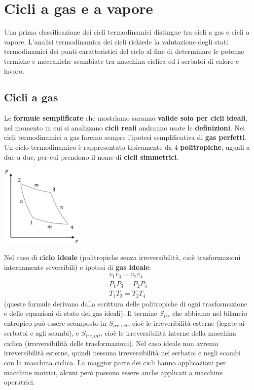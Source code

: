 \section{Cicli a gas e a vapore}
Una prima classificazione dei cicli termodinamici distingue tra cicli a gas e cicli a vapore.
L’analisi termodinamica dei cicli richiede la valutazione degli stati termodinamici dei punti
caratteristici del ciclo al fine di determinare le potenze termiche e meccaniche scambiate tra
macchina ciclica ed i serbatoi di calore e lavoro.
\subsection{Cicli a gas}
Le \textbf{formule semplificate} che mostriamo saranno \textbf{valide solo per cicli ideali}, nel momento in cui si analizzano \textbf{cicli reali} andranno usate le \textbf{definizioni}.\newline
\newline
Nei cicli termodinamici a gas faremo sempre l'ipotesi semplificativa di \textbf{gas perfetti}.\newline
\newline
Un ciclo termodinamico è rappresentato tipicamente da $4$ \textbf{politropiche}, uguali a due a due, per cui prendono il nome di \textbf{cicli simmetrici}.
\begin{center}
    \includegraphics[height=4cm]{../L07/img1.PNG}
\end{center}
Nel caso di \textbf{ciclo ideale} (politropiche senza irreversibilità, cioè trasformazioni internamente seversibili) e ipotesi di \textbf{gas ideale}:
\[
    \begin{matrix}
        v_1v_3 = v_2v_4\\
        P_1P_3 = P_2P_4\\
        T_1T_3 = T_2T_4
    \end{matrix}
\]
(queste formule derivano dalla scrittura delle politropiche di ogni trasformazione e delle equazioni di stato dei gas ideali).\newline
\newline
Il termine $S_{irr}$ che abbiamo nel bilancio entropico può essere scomposto in $S_{irr,est}$, cioè le irreveribilità esterne (legate ai serbatoi e agli scambi), e $S_{irr, int}$, cioè le irreversibilità interne della macchina ciclica (irreversibilità delle trasformazioni). Nel caso ideale non avremo irreversibilità esterne, quindi nessuna irreversibilità nei serbatoi e negli scambi con la macchina ciclica. \newline
\newline
La maggior parte dei cicli hanno applicazioni per macchine motrici, alcuni però possono essere anche applicati a macchine operatrici.

